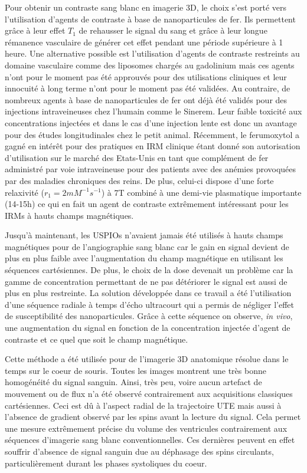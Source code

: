 Pour obtenir un contraste sang blanc en imagerie 3D, le choix s'est porté vers l'utilisation d'agents de contraste à base de nanoparticules de fer. Ils permettent grâce à leur effet $T_1$ de rehausser le signal du sang et grâce à leur longue rémanence vasculaire de générer cet effet pendant une période supérieure à 1 heure. Une alternative possible est l'utilisation d'agents de contraste restreints au domaine vasculaire comme des liposomes chargés au gadolinium \cite{Ersoy:2004aa} mais ces agents n'ont pour le moment pas été approuvés pour des utilisations cliniques et leur innocuité à long terme n'ont pour le moment pas été validées. Au contraire, de nombreux agents à base de nanoparticules de fer ont déjà été validés pour des injections intraveineuses chez l'humain comme le Sinerem. Leur faible toxicité aux concentrations injectées et dans le cas d'une injection lente est donc un avantage pour des études longitudinales chez le petit animal.
Récemment, le ferumoxytol a gagné en intérêt pour des pratiques en IRM clinique \cite{bashir2015emerging} étant donné son autorisation d'utilisation sur le marché des Etats-Unis en tant que complément de fer administré par voie intraveineuse pour des patients avec des anémies provoquées par des maladies chroniques des reins.  De plus, celui-ci dispose d'une forte relaxivité ($r_1= 2 mM^{-1}s^{-1}$) à 7T \cite{Gharagouzloo2015Quantitative-co} combiné à une demi-vie plasmatique importante (14-15h) ce qui en fait un agent de contraste extrêmement intéressant pour les IRMs à hauts champs magnétiques.

Jusqu’à maintenant, les USPIOs n’avaient jamais été utilisés à hauts champs magnétiques pour de l’angiographie sang blanc car le gain en signal devient de plus en plus faible avec l’augmentation du champ magnétique en utilisant les séquences cartésiennes. De plus, le choix de la dose devenait un problème car la gamme de concentration permettant de ne pas détériorer le signal est aussi de plus en plus restreinte. La solution développée dans ce travail a été l’utilisation d’une séquence radiale à temps d’écho ultracourt qui a permis de négliger l’effet de susceptibilité des nanoparticules. Grâce à cette séquence on observe, \textit{in vivo}, une augmentation du signal en fonction de la concentration injectée d’agent de contraste et ce quel que soit le champ magnétique.

Cette méthode a été utilisée pour de l’imagerie 3D anatomique résolue dans le temps sur le coeur de souris. Toutes les images montrent une très bonne homogénéité du signal sanguin. Ainsi, très peu, voire aucun artefact de mouvement ou de flux n'a été observé contrairement aux acquisitions classiques cartésiennes. Ceci est dû à l’aspect radial de la trajectoire UTE mais aussi à l’absence de gradient observé par les spins avant la lecture du signal. Cela permet une mesure extrêmement précise du volume des ventricules contrairement aux séquences d’imagerie sang blanc conventionnelles. Ces dernières peuvent en effet souffrir d’absence de signal sanguin due au déphasage des spins circulants, particulièrement durant les phases systoliques du coeur. 

